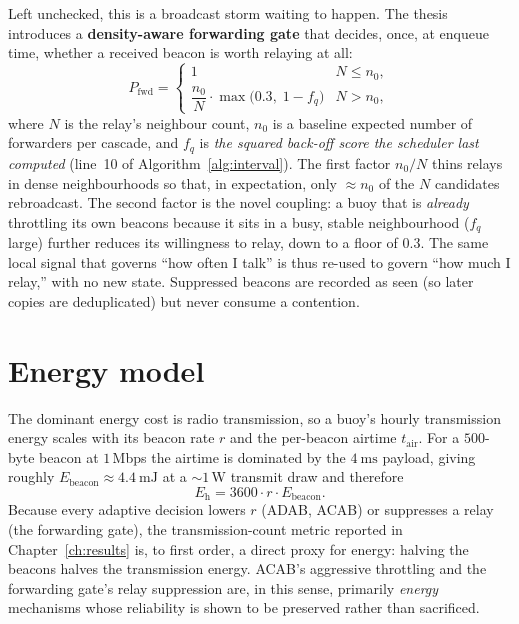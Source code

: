 \documentclass[12pt,a4paper,oneside]{report}
\begin{document}
Left unchecked, this is a broadcast storm waiting to happen. The thesis
introduces a \textbf{density-aware forwarding gate} that decides, once, at
enqueue time, whether a received beacon is worth relaying at all:
\begin{equation}
  P_{\text{fwd}} =
  \begin{cases}
    1 & N \le n_0,\\[2pt]
    \dfrac{n_0}{N}\cdot \max\!\big(0.3,\;1-f_q\big) & N > n_0,
  \end{cases}
  \label{eq:fwdgate}
\end{equation}
where $N$ is the relay's neighbour count, $n_0$ is a baseline expected number of
forwarders per cascade, and $f_q$ is \emph{the squared back-off score the
scheduler last computed} (line~10 of Algorithm~\ref{alg:interval}). The first
factor $n_0/N$ thins relays in dense neighbourhoods so that, in expectation,
only $\approx n_0$ of the $N$ candidates rebroadcast. The second factor is the
novel coupling: a buoy that is \emph{already} throttling its own beacons because
it sits in a busy, stable neighbourhood ($f_q$ large) further reduces its
willingness to relay, down to a floor of $0.3$. The same local signal that
governs ``how often I talk'' is thus re-used to govern ``how much I relay,''
with no new state. Suppressed beacons are recorded as seen (so later copies are
deduplicated) but never consume a contention.

\section{Energy model}
\label{sec:energy}
The dominant energy cost is radio transmission, so a buoy's hourly transmission
energy scales with its beacon rate $r$ and the per-beacon airtime
$t_{\text{air}}$. For a $500$-byte beacon at $1$\,Mbps the airtime is dominated
by the $\SI{4}{\milli\second}$ payload, giving roughly $E_{\text{beacon}}\approx
\SI{4.4}{\milli\joule}$ at a $\sim\!1$\,W transmit draw and therefore
\begin{equation}
  E_{\text{h}} = 3600\cdot r\cdot E_{\text{beacon}}.
\end{equation}
Because every adaptive decision lowers $r$ (ADAB, ACAB) or suppresses a relay
(the forwarding gate), the transmission-count metric reported in
Chapter~\ref{ch:results} is, to first order, a direct proxy for energy: halving
the beacons halves the transmission energy. ACAB's aggressive throttling and the
forwarding gate's relay suppression are, in this sense, primarily
\emph{energy} mechanisms whose reliability is shown to be preserved rather than
sacrificed.
\end{document}
